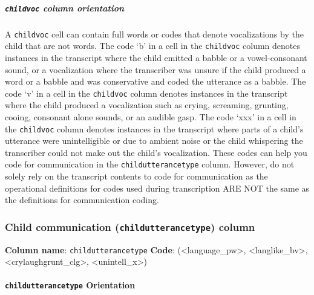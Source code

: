 \documentclass[
]{book}
\begin{document}
\hypertarget{childvoc-column-orientation}{%
\subparagraph*{\texorpdfstring{\texttt{childvoc} column orientation}{childvoc column orientation}}\label{childvoc-column-orientation}}

A \texttt{childvoc} cell can contain full words or codes that denote vocalizations by the child that are not words.
The code `b' in a cell in the \texttt{childvoc} column denotes instances in the transcript where the child emitted a babble or a vowel-consonant sound, or a vocalization where the transcriber was unsure if the child produced a word or a babble and was conservative and coded the utterance as a babble.
The code `v' in a cell in the \texttt{childvoc} column denotes instances in the transcript where the child produced a vocalization such as crying, screaming, grunting, cooing, consonant alone sounds, or an audible gasp.
The code `xxx' in a cell in the \texttt{childvoc} column denotes instances in the transcript where parts of a child's utterance were unintelligible or due to ambient noise or the child whispering the transcriber could not make out the child's vocalization.
These codes can help you code for communication in the \texttt{childutterancetype} column. However, do not solely rely on the transcript contents to code for communication as the operational definitions for codes used during transcription ARE NOT the same as the definitions for communication coding.

\hypertarget{child-communication-childutterancetype-column}{%
\subsubsection*{\texorpdfstring{Child communication (\texttt{childutterancetype}) column}{Child communication (childutterancetype) column}}\label{child-communication-childutterancetype-column}}

\textbf{Column name}: \texttt{childutterancetype}
\textbf{Code}: (\textless language\_pw\textgreater, \textless langlike\_bv\textgreater, \textless crylaughgrunt\_clg\textgreater, \textless unintell\_x\textgreater)

\hypertarget{childutterancetype-orientation}{%
\paragraph*{\texorpdfstring{\texttt{childutterancetype} Orientation}{childutterancetype Orientation}}\label{childutterancetype-orientation}}
\end{document}
